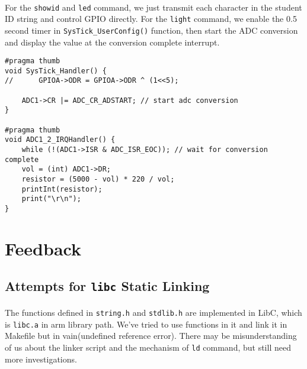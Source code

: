 \paragraph{}
For the \texttt{showid} and \texttt{led} command, we just transmit each character in the student ID string and control GPIO directly.
For the \texttt{light} command, we enable the 0.5 second timer in \texttt{SysTick\_UserConfig()} function,
then start the ADC conversion and display the value at the conversion complete interrupt.
\begin{lstlisting}
#pragma thumb
void SysTick_Handler() {
//    	GPIOA->ODR = GPIOA->ODR ^ (1<<5);

	ADC1->CR |= ADC_CR_ADSTART; // start adc conversion
}

#pragma thumb
void ADC1_2_IRQHandler() {
	while (!(ADC1->ISR & ADC_ISR_EOC)); // wait for conversion complete
	vol = (int) ADC1->DR;
    resistor = (5000 - vol) * 220 / vol;
    printInt(resistor);
    print("\r\n");
}
\end{lstlisting}
\section{Feedback}
\subsection{Attempts for \texttt{libc} Static Linking}
\paragraph{}
The functions defined in \texttt{string.h} and \texttt{stdlib.h} are implemented in LibC,
which is \texttt{libc.a} in arm library path.
We've tried to use functions in it and link it in Makefile but in vain(undefined reference error).
There may be misunderstanding of us about the linker script and the mechanism of \texttt{ld} command,
but still need more investigations.
